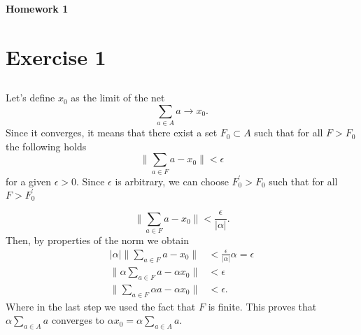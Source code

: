 \documentclass[a4paper,12pt]{article} %
\begin{document}
\begin{center} %
    {\Large \bf Homework 1}
\end{center}

\vspace{0.4cm}


\onehalfspacing
\section{Exercise 1}
\subsection{}
Let's define \(x_0\) as the limit of the net
\begin{equation}
    \sum_{a \in  A}a \to x_0.
\end{equation}
Since it converges, it means that there exist a set \(F_0 \subset A\) such that for all \(F > F_0\) the following holds
\begin{equation}
    \| \sum_{a \in  F}a - x_0  \| < \epsilon
\end{equation}
for a given \(\epsilon >0\). Since \(\epsilon \) is arbitrary, we can choose \(F^{\prime} _0> F_0\) such that for all \(F > F_0^{\prime} \)

\begin{equation}
    \| \sum_{a \in  F}a - x_0  \| < \frac{\epsilon}{|\alpha| }.
\end{equation}
Then, by properties of the norm we obtain
\begin{align*}
    \vert \alpha \vert \| \sum_{a \in  F}a - x_0  \| & < \frac{\epsilon}{|\alpha| }\alpha = \epsilon \\
    \| \alpha \sum_{a \in  F}a - \alpha x_0  \|      & < \epsilon                                    \\
    \|  \sum_{a \in  F}\alpha a - \alpha x_0  \|     & < \epsilon.
\end{align*}
Where in the last step we used the fact that \(F\) is finite.
This proves that \(\alpha \sum_{a \in  A} a\) converges to \(\alpha x_0 = \alpha \sum_{a \in  A} a \).
\end{document}
